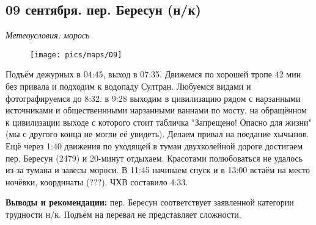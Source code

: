 \subsection{09 сентября. пер. Бересун (н/к)}
\textit{Метеоусловия: морось}

\begin{figure}[h!]
	\centering
	\texttt{[image: pics/maps/09]}
	\label{fig:09}
\end{figure}

Подъём дежурных в 04:45, выход в 07:35. Движемся по хорошей тропе 42 мин без привала и подходим к водопаду Султран. Любуемся видами и фотографируемся до 8:32. в 9:28 выходим в цивилизацию рядом с нарзанными источниками и общественнными нарзанными ваннами по мосту, на обращённом к цивилизации выходе с которого стоит табличка "Запрещено! Опасно для жизни" (мы с другого конца не могли её увидеть). Делаем привал на поедание хычынов. Ещё через 1:40 движения по уходящей в туман двухколейной дороге достигаем пер. Бересун (2479) и 20-минут отдыхаем. Красотами полюбоваться не удалось из-за тумана и завесы мороси. В 11:45 начинаем спуск и в 13:00 встаём на место ночёвки, координаты (???). ЧХВ составило 4:33.

\textbf{Выводы и рекомендации:} пер. Бересун соответствует заявленной категории трудности н/к.  Подъём на перевал не представляет сложности. 

\clearpage
